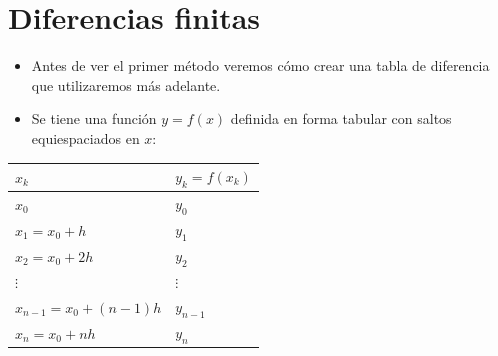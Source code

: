 \documentclass[openany]{book}
\providecommand{\tightlist}{%
  \setlength{\itemsep}{0pt}\setlength{\parskip}{0pt}}
\begin{document}
\hypertarget{diferencias-finitas}{%
\section{Diferencias finitas}\label{diferencias-finitas}}

\begin{itemize}
\tightlist
\item
  Antes de ver el primer método veremos cómo crear una tabla de diferencia que utilizaremos más adelante.
\item
  Se tiene una función \(y = f(x)\) definida en forma tabular con saltos equiespaciados en \(x\):
\end{itemize}

\begin{longtable}[]{@{}ll@{}}
\toprule
\(x_k\) & \(y_k = f(x_k)\)\tabularnewline
\midrule
\endhead
\(x_0\) & \(y_0\)\tabularnewline
\(x_1 = x_0 + h\) & \(y_1\)\tabularnewline
\(x_2 = x_0 + 2 h\) & \(y_2\)\tabularnewline
\(\vdots\) & \(\vdots\)\tabularnewline
\(x_{n-1} = x_0 + (n-1) h\) & \(y_{n-1}\)\tabularnewline
\(x_{n} = x_0 + n h\) & \(y_n\)\tabularnewline
\bottomrule
\end{longtable}
\end{document}

